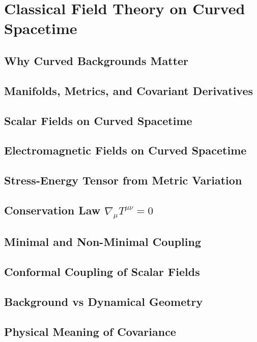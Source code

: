 \chapter{Classical Field Theory on Curved Spacetime}

\section{Why Curved Backgrounds Matter}
\section{Manifolds, Metrics, and Covariant Derivatives}
\section{Scalar Fields on Curved Spacetime}
\section{Electromagnetic Fields on Curved Spacetime}
\section{Stress-Energy Tensor from Metric Variation}
\section{Conservation Law \texorpdfstring{\(\nabla_\mu T^{\mu\nu}=0\)}{nabla_mu Tmunu = 0}}
\section{Minimal and Non-Minimal Coupling}
\section{Conformal Coupling of Scalar Fields}
\section{Background vs Dynamical Geometry}
\section{Physical Meaning of Covariance}
